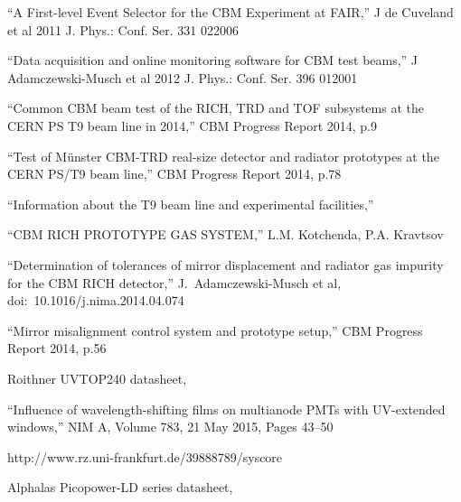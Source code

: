 \begin{thebibliography}{99}
``A First-level Event Selector for the CBM Experiment at FAIR,''
J de Cuveland et al 2011 J. Phys.: Conf. Ser. 331 022006

``Data acquisition and online monitoring software for CBM test beams,''
J Adamczewski-Musch et al 2012 J. Phys.: Conf. Ser. 396 012001


``Common CBM beam test of the RICH, TRD and TOF subsystems at the CERN PS T9 beam line in 2014,''
CBM Progress Report 2014, p.9

``Test of M\"unster CBM-TRD real-size detector and radiator prototypes at the CERN PS/T9 beam line,''
CBM Progress Report 2014, p.78

``Information about the T9 beam line and experimental facilities,''

``CBM RICH PROTOTYPE GAS SYSTEM,''
L.M. Kotchenda, P.A. Kravtsov

``Determination of tolerances of mirror displacement and radiator gas impurity for the CBM RICH detector,''
J.~Adamczewski-Musch et al,
doi:~10.1016/j.nima.2014.04.074

``Mirror misalignment control system and prototype setup,''
CBM Progress Report 2014, p.56

Roithner UVTOP240 datasheet,

``Influence of wavelength-shifting films on multianode PMTs with UV-extended windows,''
NIM A, Volume 783, 21 May 2015, Pages 43–50

http://www.rz.uni-frankfurt.de/39888789/syscore

Alphalas Picopower-LD series datasheet,



\end{thebibliography}
